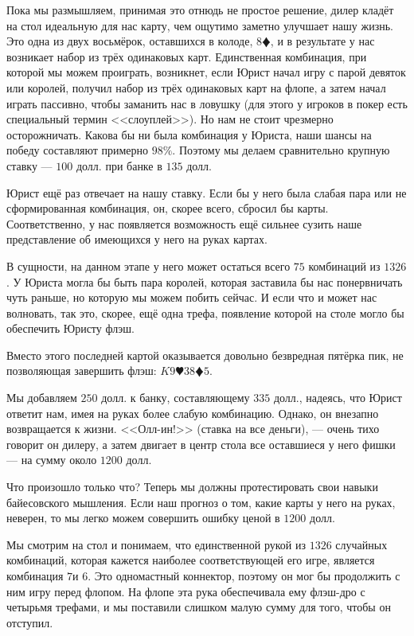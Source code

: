 \documentclass[12pt, a4paper, oneside]{extreport}
\theoremstyle{plain}              %
\theoremstyle{definition}         %
\begin{document}
Пока мы размышляем, принимая это отнюдь не простое решение, дилер кладёт на стол идеальную для нас карту, чем ощутимо заметно улучшает нашу жизнь. Это одна из двух восьмёрок, оставшихся в колоде, $8\vardiamond$, и в результате у нас возникает набор из трёх одинаковых карт. Единственная комбинация, при которой мы можем проиграть, возникнет, если Юрист начал игру с парой девяток или королей, получил набор из трёх одинаковых карт на флопе, а затем начал играть пассивно, чтобы заманить нас в ловушку (для этого у игроков в покер есть специальный термин <<слоуплей>>). Но нам не стоит чрезмерно осторожничать. Какова бы ни была комбинация у Юриста, наши шансы на победу составляют примерно $98\%$. Поэтому мы делаем сравнительно крупную ставку --- $100$ долл. при банке в $135$ долл.

Юрист ещё раз отвечает на нашу ставку. Если бы у него была слабая пара или не сформированная комбинация, он, скорее всего, сбросил бы карты. Соответственно, у нас появляется возможность ещё сильнее сузить наше представление об имеющихся у него на руках картах.

В сущности, на данном этапе у него может остаться всего $75$ комбинаций из $1326$. У Юриста могла бы быть пара королей, которая заставила бы нас понервничать чуть раньше, но которую мы можем побить сейчас. И если что и может нас волновать, так это, скорее, ещё одна трефа, появление которой на столе могло бы обеспечить Юристу флэш.

Вместо этого последней картой оказывается довольно безвредная пятёрка пик, не позволяющая завершить флэш:  $K$\clubsuit  $9\varheart  3$\clubsuit $8\vardiamond 5$\spadesuit.

Мы добавляем $250$ долл. к банку, составляющему $335$ долл., надеясь, что Юрист ответит нам, имея на руках более слабую комбинацию. Однако, он внезапно возвращается к жизни. <<Олл-ин!>> (ставка на все деньги), --- очень тихо говорит он дилеру, а затем двигает в центр стола все оставшиеся у него фишки --- на сумму около $1200$ долл.

Что произошло только что? Теперь мы должны протестировать свои навыки байесовского мышления. Если наш прогноз о том, какие карты у него на руках, неверен, то мы легко можем совершить ошибку ценой в $1200$ долл.

Мы смотрим на стол и понимаем, что единственной рукой из $1326$ случайных комбинаций, которая кажется наиболее соответствующей его игре, является комбинация $7$\clubsuit и $6$\clubsuit. Это одномастный коннектор, поэтому он мог бы продолжить с ним игру перед флопом. На флопе эта рука обеспечивала ему флэш-дро с четырьмя трефами, и мы поставили слишком малую сумму для того, чтобы он отступил.
\end{document}
